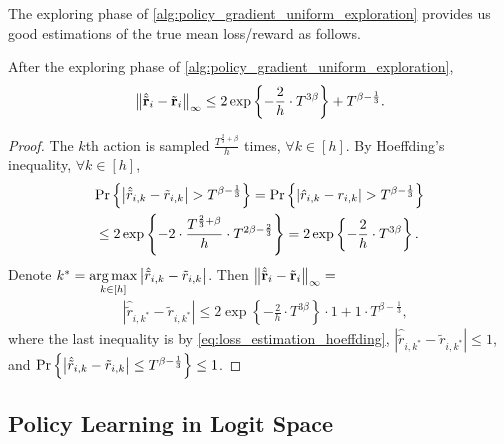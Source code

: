 The exploring phase of \cref{alg:policy_gradient_uniform_exploration} provides us good estimations of the true mean loss/reward as follows.
\begin{thm}
\label{thm:loss_estimation_hoeffding}
    After the exploring phase of \cref{alg:policy_gradient_uniform_exploration},
\begin{equation*}
    \left\| \hat{{\tilde{\mathbf{r}}}}_i - {\tilde{\mathbf{r}}}_i \right\|_\infty \le 2 \exp\left\{ - \frac{2}{h} \cdot  T^{3\beta} \right\} + T^{\beta - \frac{1}{3}}.
\end{equation*}
\end{thm}
\begin{proof}
    The $k$th action is sampled $\frac{T^{\frac{2}{3} + \beta} }{h}$ times, $\forall k \in [h]$. By Hoeffding's inequality, $\forall k \in [h]$,
\begin{equation}
\label{eq:loss_estimation_hoeffding}
\begin{split}
    &{\text{Pr}}\left\{ \left| \hat{\tilde{r}}_{i, k} - \tilde{r}_{i,k} \right| > T^{\beta - \frac{1}{3}} \right\} = {\text{Pr}}\left\{ \left| \hat{r}_{i, k} - r_{i,k} \right| > T^{\beta - \frac{1}{3}} \right\} \\
    &\le 2 \exp\left\{ - 2 \cdot  \frac{T^{\frac{2}{3} + \beta}}{h} \cdot T^{2\beta - \frac{2}{3}} \right\} = 2 \exp\left\{ - \frac{2}{h} \cdot  T^{3\beta} \right\}.
\end{split}
\end{equation}
Denote $k^* = \operatorname*{arg\,max}\limits_{k \in [h]}{ \left| \hat{\tilde{r}}_{i, k} - \tilde{r}_{i,k} \right| }$. Then $\left\| \hat{{\tilde{\mathbf{r}}}}_i - {\tilde{\mathbf{r}}}_i \right\|_\infty =$
\begin{equation*}
\begin{split}
    &\left| \hat{\tilde{r}}_{i, k^*} - \tilde{r}_{i,k^*} \right| \le 2 \exp\left\{ - \frac{2}{h} \cdot  T^{3\beta} \right\} \cdot 1 + 1 \cdot T^{\beta - \frac{1}{3}},
\end{split}
\end{equation*}
where the last inequality is by \cref{eq:loss_estimation_hoeffding}, $\left| \hat{\tilde{r}}_{i, k^*} - \tilde{r}_{i,k^*} \right| \le 1$, and ${\text{Pr}}\left\{ \left| \hat{\tilde{r}}_{i, k} - \tilde{r}_{i,k} \right| \le T^{\beta - \frac{1}{3}} \right\} \le 1$. 
\end{proof}

\subsection{Policy Learning in Logit Space}

